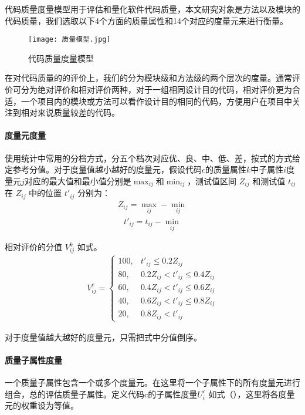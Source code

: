 代码质量度量模型用于评估和量化软件代码质量，本文研究对象是方法以及模块的代码质量，我们选取以下4个方面的质量属性和14个对应的度量元来进行衡量。

\begin{figure}[h]
\centering
\texttt{[image: 质量模型.jpg]}
\caption{代码质量度量模型}
\end{figure}

在对代码质量的的评价上，我们的分为模块级和方法级的两个层次的度量。通常评价可分为绝对评价和相对评价两种，对于一组相同设计目的代码，相对评价更为合适\cite{黄沛杰2011代码质量静态度量的研究与应用}，一个项目内的模块或方法可以看作设计目的相同的代码，方便用户在项目中关注到相对来说质量较差的代码。

\paragraph{度量元度量} 使用统计中常用的分档方式，分五个档次对应优、良、中、低、差，按式的方式给定参考分值。对于度量值越小越好的度量元，假设代码$c$的质量属性$k$中子属性$i$度量元$j$对应的最大值和最小值分别是$\max_{ij}$和$\min_{ij}$，测试值区间 \(Z_{ij}\) 和测试值 \(t_{ij}\) 在 \(Z_{ij}\) 中的位置 \(t'_{ij}\) 分别为：
\begin{align}
Z_{ij} = \max_{ij} - \min_{ij}
\end{align}
\begin{align}
t'_{ij} = t_{ij} - \min_{ij}
\end{align}

相对评价的分值 \(V_{ij}^k\) 如式。
\begin{align}
V_{ij}^c = 
\begin{cases} 
100, & t'_{ij} \leq 0.2Z_{ij} \\ 
80, & 0.2Z_{ij} < t'_{ij} \leq 0.4Z_{ij} \\ 
60, & 0.4Z_{ij} < t'_{ij} \leq 0.6Z_{ij} \\ 
40, & 0.6Z_{ij} < t'_{ij} \leq 0.8Z_{ij} \\ 
20, & 0.8Z_{ij} < t'_{ij}
\end{cases}
\end{align}

对于度量值越大越好的度量元，只需把式中分值倒序。

\paragraph{质量子属性度量} 一个质量子属性包含一个或多个度量元。在这里将一个子属性下的所有度量元进行组合，总的评估质量子属性。定义代码c的子属性度量$U_{i}^c$ 如式（），这里将各度量元的权重设为等值。

